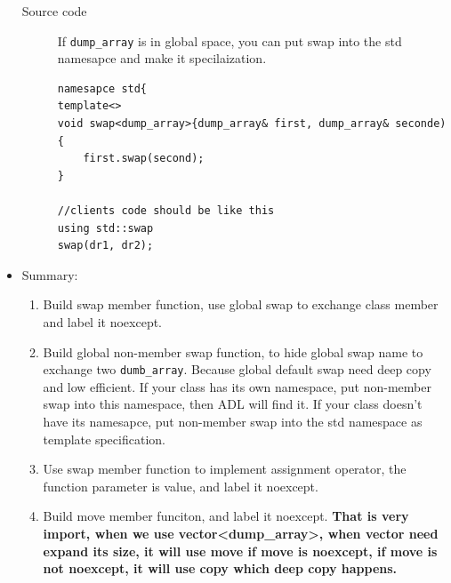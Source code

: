 \documentclass[a4paper,11pt,twoside]{book}
\begin{document}
\begin{itemize}
\begin{description}
    \item [Source code] If \texttt{dump\_array} is in global space, you can put swap into the std namesapce and make it specilaization.
\begin{lstlisting}
namesapce std{
template<> 
void swap<dump_array>{dump_array& first, dump_array& seconde){
	first.swap(second);
}

//clients code should be like this
using std::swap
swap(dr1, dr2); 
\end{lstlisting}

\end{description}

\item Summary:
\begin{enumerate}
	\item Build swap member function, use global swap to exchange class member and label it noexcept.

	\item Build global non-member swap function, to hide global swap name to exchange two \texttt{dumb\_array}. Because global default swap need deep copy and low efficient. If your class has its own namespace, put non-member swap into this namespace, then ADL will find it. If your class doesn't have its namesapce, put non-member swap into the std namespace as template specification. 
	\item Use swap member function to implement assignment operator, the function parameter is value, and label it noexcept. 
	\item Build move member funciton, and label it noexcept. \textbf{That is very import, when we use vector<dump\_array>, when vector need expand its size, it will use move if move is noexcept, if move is not noexcept, it will use copy which deep copy happens. }
\end{enumerate}
\end{itemize}
	
\end{document}
